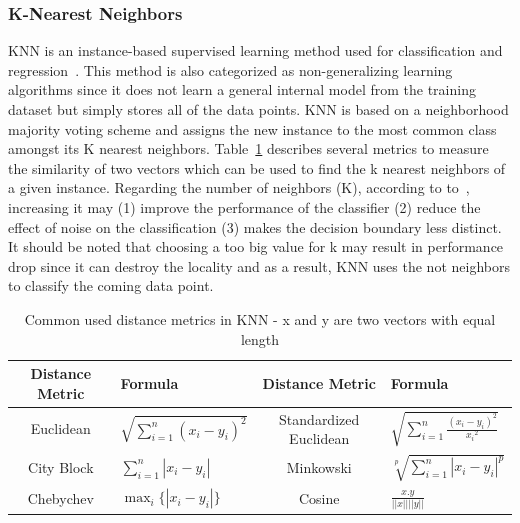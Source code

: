 \subsubsection{K-Nearest Neighbors} 
KNN is an instance-based supervised learning method used for classification and regression~\citep{cover1967nearest}. This method is also categorized as non-generalizing learning algorithms since it does not learn a general internal model from the training dataset but simply stores all of the data points. KNN is based on a neighborhood majority voting scheme and
assigns the new instance to the most common class amongst its K nearest neighbors. Table~\ref{tab:KNN_distances} describes several metrics to measure the similarity of two vectors which can be used to find the k nearest neighbors of a given instance. Regarding the number of neighbors (K), according to to~\citep{doi:10.1002/9780470977811.ch8}, increasing it may (1) improve the performance of the classifier (2) reduce the effect of noise on the classification (3) makes the decision boundary less distinct. It should be noted that choosing a too big value for k may result in performance drop since it can destroy the locality and as a result, KNN uses the not neighbors to classify the coming data point. 


\begin{table}[h]
    \centering
\renewcommand{\arraystretch}{2.5}
\begin{tabular}{|c|>{\centering}m{4cm}|c|>{\centering}m{4cm}|}
\hline 
Distance Metric & Formula & Distance Metric & Formula  \tabularnewline
\hline 
\hline 
 Euclidean& $\sqrt{\sum_{i=1}^{n} {(x_i - y_i)}^{2}}$  & Standardized
Euclidean &  $\sqrt{\sum_{i=1}^{n} \frac{{(x_i - y_i)}^{2}}{{x_{i}}^2}}$ \tabularnewline
\hline 
 City Block & ${\sum_{i=1}^{n} {|x_i - y_i|}}$ & Minkowski & $\sqrt[p]{\sum_{i=1}^{n} {{|x_i - y_i|}}^{p}}$ \tabularnewline
\hline 
Chebychev & $\max_i \{|x_i - y_i|\}$  & Cosine & $\frac{x.y}{||x||||y||}$\tabularnewline
\hline 
\end{tabular}
\caption{Common used distance metrics in KNN - x and y are two vectors with equal length}
    \label{tab:KNN_distances}
\end{table}
\renewcommand{\arraystretch}{1}


